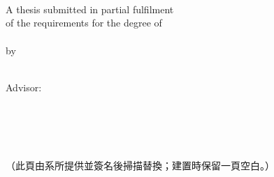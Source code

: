 \ThesisFrontMatterPages
\ThesisUnnumberedPage
\begin{center}
  {
   \large
   \univEname\\[0.6em]
   \ThesisIfBlank{\collEname}{}{\collEname\\[0.6em]}%
   \fullDeptEname\\[3.5em]

   \LARGE
   \eTitle\\[3em]

   \large\mdseries
   A thesis submitted in partial fulfilment\\
   of the requirements for the degree of\\[0.6em]
   \degreeEname\\[3em]

   by\\[0.6em]
   \myEname\\[0.6em]
   \ThesisIfBlank{\myStudentId}{}{(\myStudentId)\\[0.6em]}%
   \vspace{1em}

   Advisor: \advisorEnameA\\[0.3em]
  }
  \vfill
  {\large \ePlace\\[0.4em] \eMonth\ \eYear}
\end{center}
\clearpage

\chapter*{\nameCommitteeForm}
\begin{center}
  \vspace*{4em}
  （此頁由系所提供並簽名後掃描替換；建置時保留一頁空白。）
\end{center}
\clearpage

